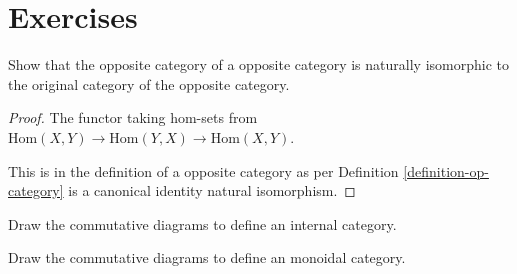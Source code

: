 \section{Exercises}

\begin{exercise}
    \label{exercise-opposite-opposite-category}
Show that the opposite category of a opposite category is naturally isomorphic to the original
category of the opposite category.
\end{exercise}

\begin{proof}
    The functor taking hom-sets from $\mathrm{Hom}(X,Y) \rightarrow \mathrm{Hom}(Y,X) \rightarrow \mathrm{Hom}(X,Y)$.

    This is in the definition of a opposite category as per Definition \ref{definition-op-category} is a canonical identity natural isomorphism.
\end{proof}

\begin{exercise}
    \label{exercise-commutative-diagram-internal}
Draw the commutative diagrams to define an internal category.
\end{exercise}

\begin{exercise}
    \label{exercise-commutative-diagram-monoidal}
Draw the commutative diagrams to define an monoidal category.
\end{exercise}